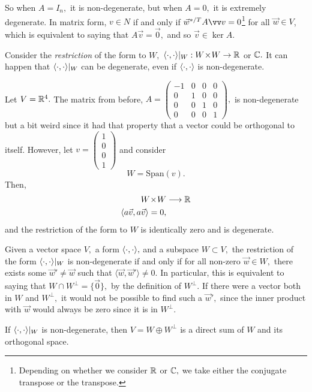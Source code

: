 So when $A = I_n,$ it is non-degenerate, but when $A = 0,$ it is extremely degenerate. In matrix form, $v \in N$ if and only if $\vec{w}^{*/T}A\vvv = 0$\footnote{Depending on whether we consider $\mathbb R$ or $\mathbb C,$ we take either the conjugate transpose or the transpose.} for all $\vec{w} \in V$, which is equivalent to saying that $A\vec{v} = \vec{0},$ and so $\vec{v} \in \ker A.$ 

Consider the \emph{restriction} of the form to $W,$ $\langle \cdot, \cdot \rangle |_W: W \hspace{0.05em}{\times}\hspace{0.05em} W \rightarrow \mathbb R$ or $\mathbb C.$ It can happen that $\langle \cdot, \cdot \rangle |_W$ can be degenerate, even if $\langle \cdot, \cdot \rangle$ is non-degenerate. 

\begin{example}
Let $V = \mathbb R^4.$ The matrix from before, $A = \begin{pmatrix}
-1 & 0 & 0 & 0 \\
0 & 1 & 0 & 0 \\
0 & 0 & 1 & 0 \\
0 & 0 & 0 & 1
\end{pmatrix},$ is non-degenerate but a bit weird since it had that property that a vector could be orthogonal to itself. However, let $v = \begin{pmatrix}1 \\ 0 \\ 0 \\ 1\end{pmatrix}$ and consider
\[
W = \text{Span}(v).
\]
Then, 
\begin{align*}
W \hspace{0.05em}{\times}\hspace{0.05em} W &\longrightarrow \mathbb R \\
\langle a\vec{v}, a\vec{v}\rangle = 0,
\end{align*}
and the restriction of the form to $W$ is identically zero and is degenerate.
\end{example}

Given a vector space $V,$ a form $\langle \cdot, \cdot \rangle,$ and a subspace $W \subset V,$ the restriction of the form $\langle \cdot, \cdot \rangle|_W$ is non-degenerate if and only if for all non-zero $\vec{w} \in W,$ there exists some $\vec{w}' \neq \vec{w}$ such that $\langle \vec{w}, \vec{w}'\rangle \neq 0$. In particular, this is equivalent to saying that $W \cap W^{\perp} = \{\vec{0}\},$ by the definition of $W^{\perp}.$ If there were a vector both in $W$ and $W^{\perp},$ it would not be possible to find such a $\vec{w}',$ since the inner product with $\vec{w}$ would always be zero since it is in $W^{\perp}.$ %

\begin{theorem}
If $\langle \cdot, \cdot \rangle|_W$ is non-degenerate, then $V = W \oplus W^{\perp}$ is a direct sum of $W$ and its orthogonal space. 
\end{theorem}

